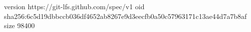 version https://git-lfs.github.com/spec/v1
oid sha256:6c5d19dbbccb036df4652ab8267e9d3eecfb0a50c57963171c13ae44d7a7b8af
size 98400
